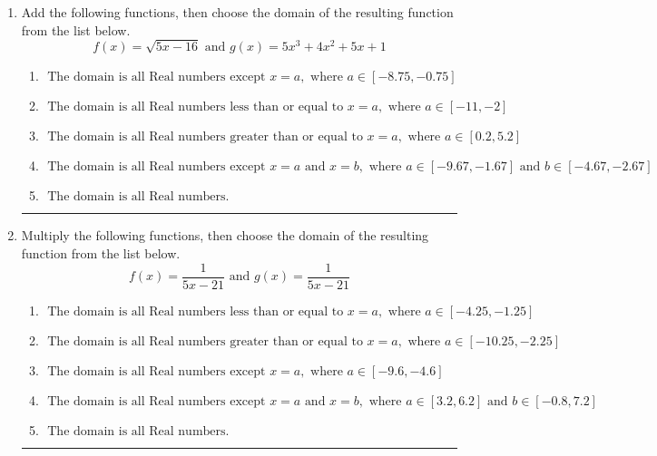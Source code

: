 \documentclass[14pt]{extbook}
\newcommand{\litem}[1]{\item#1\hspace*{-1cm}\rule{\textwidth}{0.4pt}}
\begin{document}
\begin{enumerate}
{\begin{enumerate}[label=\Alph*.]
\end{enumerate} }
\litem{
Add the following functions, then choose the domain of the resulting function from the list below.\[ f(x) = \sqrt{5x-16}  \text{ and } g(x) = 5x^{3} +4 x^{2} +5 x + 1 \]\begin{enumerate}[label=\Alph*.]
\item \( \text{ The domain is all Real numbers except } x = a, \text{ where } a \in [-8.75, -0.75] \)
\item \( \text{ The domain is all Real numbers less than or equal to } x = a, \text{ where } a \in [-11, -2] \)
\item \( \text{ The domain is all Real numbers greater than or equal to } x = a, \text{ where } a \in [0.2, 5.2] \)
\item \( \text{ The domain is all Real numbers except } x = a \text{ and } x = b, \text{ where } a \in [-9.67, -1.67] \text{ and } b \in [-4.67, -2.67] \)
\item \( \text{ The domain is all Real numbers. } \)

\end{enumerate} }
\litem{
Multiply the following functions, then choose the domain of the resulting function from the list below.\[ f(x) = \frac{1}{5x-21} \text{ and } g(x) = \frac{1}{5x-21} \]\begin{enumerate}[label=\Alph*.]
\item \( \text{ The domain is all Real numbers less than or equal to } x = a, \text{ where } a \in [-4.25, -1.25] \)
\item \( \text{ The domain is all Real numbers greater than or equal to } x = a, \text{ where } a \in [-10.25, -2.25] \)
\item \( \text{ The domain is all Real numbers except } x = a, \text{ where } a \in [-9.6, -4.6] \)
\item \( \text{ The domain is all Real numbers except } x = a \text{ and } x = b, \text{ where } a \in [3.2, 6.2] \text{ and } b \in [-0.8, 7.2] \)
\item \( \text{ The domain is all Real numbers. } \)

\end{enumerate} }
\end{enumerate}
\end{document}
